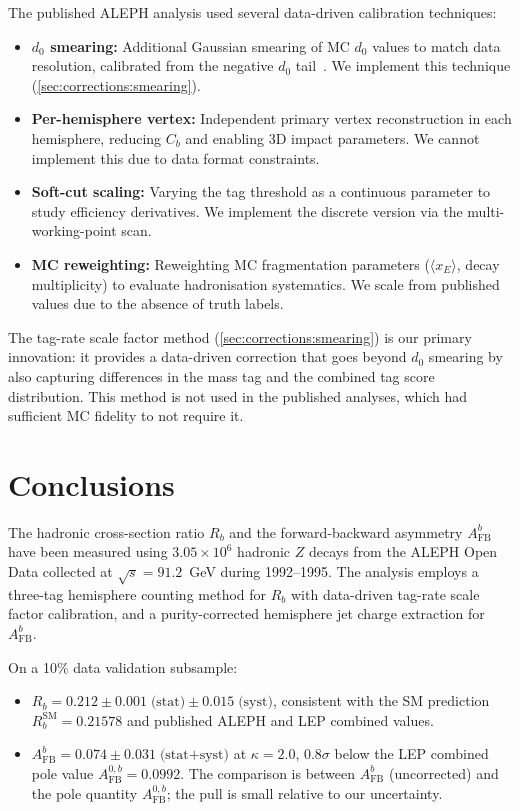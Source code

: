 \documentclass[11pt,a4paper]{article}
\begin{document}
The published ALEPH analysis used several data-driven calibration
techniques:
\begin{itemize}
\item \textbf{$d_0$ smearing:} Additional Gaussian smearing of MC
  $d_0$ values to match data resolution, calibrated from the
  negative $d_0$ tail~\cite{ALEPH:Rb:precise}.
  We implement this technique (\cref{sec:corrections:smearing}).
\item \textbf{Per-hemisphere vertex:} Independent primary vertex
  reconstruction in each hemisphere, reducing $C_b$ and enabling
  3D impact parameters.
  We cannot implement this due to data format constraints.
\item \textbf{Soft-cut scaling:} Varying the tag threshold as a
  continuous parameter to study efficiency derivatives.
  We implement the discrete version via the multi-working-point
  scan.
\item \textbf{MC reweighting:} Reweighting MC fragmentation
  parameters ($\langle x_E \rangle$, decay multiplicity) to
  evaluate hadronisation systematics.
  We scale from published values due to the absence of truth
  labels.
\end{itemize}

The tag-rate scale factor method (\cref{sec:corrections:smearing})
is our primary innovation: it provides a data-driven correction
that goes beyond $d_0$ smearing by also capturing differences in
the mass tag and the combined tag score distribution.
This method is not used in the published analyses, which had
sufficient MC fidelity to not require it.

\section{Conclusions}
\label{sec:conclusions}

The hadronic cross-section ratio $R_b$ and the forward-backward
asymmetry $A_\text{FB}^b$ have been measured using $3.05 \times
10^6$ hadronic $Z$ decays from the ALEPH Open Data collected at
$\sqrt{s} = 91.2$~GeV during 1992--1995.
The analysis employs a three-tag hemisphere counting method for
$R_b$ with data-driven tag-rate scale factor calibration, and a
purity-corrected hemisphere jet charge extraction for
$A_\text{FB}^b$.

On a 10\% data validation subsample:
\begin{itemize}
\item $R_b = 0.212 \pm 0.001\;\text{(stat)} \pm 0.015\;\text{(syst)}$,
  consistent with the SM prediction $R_b^\text{SM} = 0.21578$ and
  published ALEPH and LEP combined values.
\item $A_\text{FB}^b = 0.074 \pm 0.031\;\text{(stat+syst)}$
  at $\kappa = 2.0$, $0.8\sigma$ below the LEP
  combined pole value $A_\text{FB}^{0,b} = 0.0992$.
  The comparison is between $A_\text{FB}^b$ (uncorrected) and the
  pole quantity $A_\text{FB}^{0,b}$; the pull is small relative to
  our uncertainty.
\end{itemize}
\end{document}
